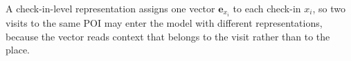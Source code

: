 \begin{definition}\label{def:fund:checkinlevel}
    A check-in-level representation assigns one vector $\mathbf{e}_{x_i}$ to each check-in
    $x_i$, so two visits to the same POI may enter the model with different
    representations, because the vector reads context that belongs to the visit rather
    than to the place.
\end{definition}

